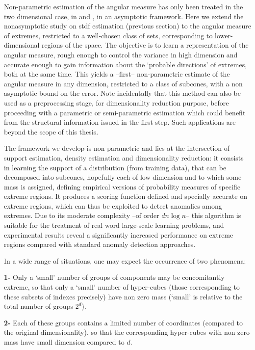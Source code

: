 Non-parametric estimation of the angular measure has only been treated in the two dimensional case, in \cite{Einmahl2001} and \cite{Einmahl2009}, in an asymptotic framework. Here we extend the nonasymptotic study on {\sc stdf} estimation (previous section) to the angular measure of extremes, restricted to a well-chosen class of sets, corresponding to lower-dimensional regions of the space. The objective is to learn a representation of the angular measure, rough enough to control the variance in high dimension and accurate enough to gain information about the `probable directions' of extremes, both at the same time. This yields a --first-- non-parametric estimate of the angular measure in any dimension, restricted to a class of subcones, %
with a non asymptotic bound on the error. 
Note incidentally that this method can also be used as a preprocessing stage, for dimensionality reduction purpose, before proceeding with a parametric or semi-parametric estimation which could benefit from the structural information issued in the first step. Such applications are beyond the scope of this thesis.

The framework we develop is non-parametric and lies at the intersection of support estimation, density estimation and dimensionality reduction: it consists in learning the support of a distribution (from training data), that can be decomposed into subcones, hopefully each of low dimension and to which some mass is assigned, defining empirical versions of probability measures of specific extreme regions. 
It produces a scoring function defined and specially accurate on extreme regions, which can thus be exploited to detect anomalies among extremes.
Due to its moderate complexity --of order $d n \log n$-- this algorithm is suitable for the treatment of real word large-scale learning problems, and experimental results reveal a significantly increased performance on extreme regions compared with standard anomaly detection approaches. 



In a wide range of situations, one may expect the occurrence of two phenomena:

\textbf{1-} Only a `small' number of groups of components may be concomitantly extreme, so that only a `small' number of hyper-cubes (those corresponding to these subsets of indexes precisely) have non zero mass (`small' is relative to the total number of groups $2^d$).

\textbf{2-} Each of these groups contains a limited number of coordinates (compared to the original dimensionality), so that the corresponding hyper-cubes with non zero mass have small dimension compared to $d$.

